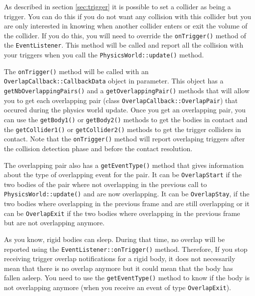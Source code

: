 \documentclass[a4paper,12pt]{article}
\begin{document}
    As described in section \ref{sec:trigger} it is possible to set a collider as being a trigger. You can do this if you do not want any collision with
    this collider but you are only interested in knowing when another collider enters or exit the volume of the collider. If you do this, you will need
    to override the \texttt{onTrigger()} method of the \texttt{EventListener}. This method will be called and report all the collision with your triggers
    when you call the \texttt{PhysicsWorld::update()} method. \\

    \begin{sloppypar}
    The \texttt{onTrigger()} method will be called with an \texttt{OverlapCallback::CallbackData} object in parameter. This object has a
    \texttt{getNbOverlappingPairs()} and a \texttt{getOverlappingPair()} methods that will allow you to get each overlapping pair (class
    \texttt{OverlapCallback::OverlapPair}) that occured during the physics world update. Once you get an overlapping pair, you can use
    the \texttt{getBody1()} or \texttt{getBody2()} methods to get the bodies in
    contact and the \texttt{getCollider1()} or \texttt{getCollider2()} methods to get the trigger colliders in contact.
    Note that the \texttt{onTrigger()} method will report overlaping triggers after the collision detection phase and before the contact resolution. \\
    \end{sloppypar}

    \begin{sloppypar}
    The overlapping pair also has a \texttt{getEventType()} method that gives information about the type of overlapping event for the pair. It can be
    \texttt{OverlapStart} if the two bodies of the pair where not overlapping in the previous call to \texttt{PhysicsWorld::update()} and are now
    overlapping. It can be \texttt{OverlapStay}, if the two bodies where overlapping in the previous frame and are still overlapping or it can be
    \texttt{OverlapExit} if the two bodies where overlapping in the previous frame but are not overlapping anymore. \\
    \end{sloppypar}

    \begin{sloppypar}
    As you know, rigid bodies can sleep. During that time, no overlap will be reported using the \texttt{EventListener::onTrigger()} method. Therefore,
    If you stop receiving trigger overlap notifications for a rigid body, it does not necessarily mean that there is no overlap anymore but it could mean
    that the body has fallen asleep. You need to use the \texttt{getEventType()} method to know if the body is not overlapping anymore (when you receive an
    event of type \texttt{OverlapExit}). \\
    \end{sloppypar}
\end{document}
